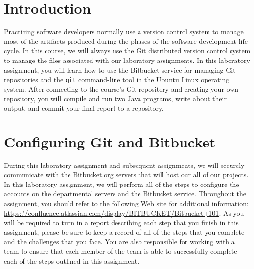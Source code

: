 


\usepackage[compact]{titlesec}



\section*{Introduction}

Practicing software developers normally use a version control system to manage most of the artifacts produced during the
phases of the software development life cycle.  In this course, we will always use the Git distributed version control
system to manage the files associated with our laboratory assignments.  In this laboratory assignment, you will learn
how to use the Bitbucket service for managing Git repositories and the {\tt git} command-line tool in the Ubuntu Linux
operating system. After connecting to the course's Git repository and creating your own repository, you will compile and
run two Java programs, write about their output, and commit your final report to a repository.

\section*{Configuring Git and Bitbucket}

During this laboratory assignment and subsequent assignments, we will securely communicate with the Bitbucket.org
servers that will host our all of our projects.  In this laboratory assignment, we will perform all of the steps to
configure the accounts on the departmental servers and the Bitbucket service.  Throughout the assignment, you should
refer to the following Web site for additional information:
\url{https://confluence.atlassian.com/display/BITBUCKET/Bitbucket+101}.  As you will be required to turn in a report 
describing each step that you finish in this assignment, please be sure to keep a record of all of the steps that you
complete and the challenges that you face.  You are also responsible for working with a team to ensure that
each member of the team is able to successfully complete each of the steps outlined in this assignment.

